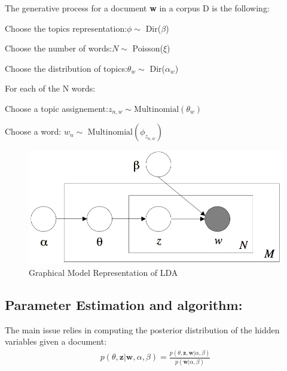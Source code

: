 \documentclass[twoside]{article}
\begin{document}
\begin{multicols}{2}
\noindent The generative process for a document \textbf{w} in a corpus D is the following:
\\
\begin{compactenum}
	\item Choose the topics representation:\newline $\phi \sim$ Dir($\beta$)
	\item Choose the number of words:\newline $ N \sim $ Poisson($ \xi $)
	\item Choose the distribution of topics:\newline $\theta_w \sim$ Dir($\alpha_w$)
	\item For each of the N words:
	\begin{compactenum}
		\item Choose a topic assignement:\newline $z_{n,w} \sim \text{Multinomial}(\theta_w)$
		\item Choose a word: \newline$w_n \sim \text{ Multinomial}(\phi_{z_{n,w}})$
	\end{compactenum}
\end{compactenum}

\begin{figure}[H]
\centering
\includegraphics[width=0.8\linewidth]{img/LDA.png}
\caption{Graphical Model Representation of LDA}
\end{figure}

\subsection{Parameter Estimation and algorithm:}

The main issue relies in computing the posterior distribution of the hidden variables given a document:\\

\begin{align*}
p(\theta, \mathbf{z} |\mathbf{w}, \alpha, \beta) = \frac{p(\theta, \mathbf{z}, \mathbf{w} | \alpha, \beta)}{p(\mathbf{w} | \alpha, \beta)}
\end{align*}


\end{multicols}
\end{document}
